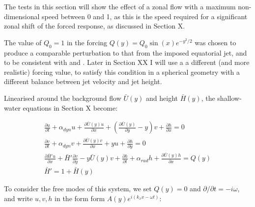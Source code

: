 The tests in this section will show the effect of a zonal flow with a maximum non-dimensional speed between 0 and 1, as this is the speed required for a significant zonal shift of the forced response, as discussed in Section X.

The value of $Q_{0}=1$ in the forcing $Q(y)=Q_{0}\sin(x)e^{-y^{2}/2}$ was chosen to produce a comparable perturbation to that from the imposed equatorial jet, and to be consistent with \citet{matsuno1966quasi} and \citet{showman2011superrotation}. Later in Section XX I will use a a different (and more realistic) forcing value, to satisfy this condition in a spherical geometry with a different balance between jet velocity and jet height.


Linearised around the background flow $\bar{U}(y)$ and height $\bar{H}(y)$, the shallow-water equations in Section X become:

\begin{equation}\label{eqn:shear-sw-equations}
    \begin{gathered}
      \frac{\partial u}{\partial t} +  \alpha_{dyn} u + \frac{\partial \bar{U}(y)u}{\partial x} +(\frac{\partial \bar{U}(y)}{\partial y} - y)v + \frac{\partial h}{\partial x} = 0 \\
      \frac{\partial v}{\partial t} +  \alpha_{dyn} v + \frac{\partial \bar{U}(y)v}{\partial x} + y u + \frac{\partial h}{\partial y} = 0 \\
      \frac{\partial \bar{H}' u}{\partial x} + \bar{H}'\frac{\partial v}{\partial y} - y\bar{U}(y) v +\frac{\partial h}{\partial t} +  \alpha_{rad} h + \frac{\partial \bar{U}(y) h}{\partial x} = Q(y)\\
        \bar{H}' = 1+\bar{H}(y)
    \end{gathered}
\end{equation}


To consider the free modes of this system, we set $Q(y)=0$ and $\partial /\partial t = -i \omega$, and write $u,v,h$ in the form form $A(y) e^{i(k_{x}x - \omega t)}$:


